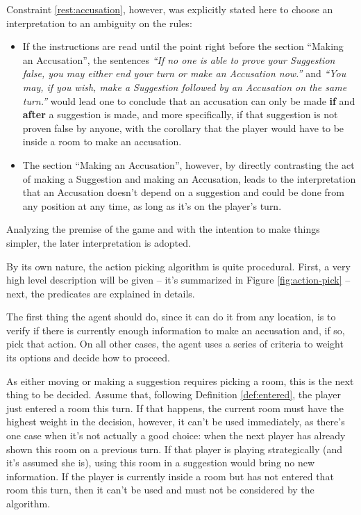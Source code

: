 \documentclass[12pt,a4paper]{article}
\begin{document}
Constraint \ref{rest:accusation}, however, was explicitly stated here to choose an interpretation to an ambiguity on the rules:
\begin{itemize}
    \item If the instructions are read until the point right before the section ``Making an Accusation'', the sentences \textit{``If no one is able to prove your Suggestion false, you may either end your turn or make an Accusation now.''} and \textit{``You may, if you wish, make a Suggestion followed by an Accusation on the same turn.''} would lead one to conclude that an accusation can only be made \textbf{if} and \textbf{after} a suggestion is made, and more specifically, if that suggestion is not proven false by anyone, with the corollary that the player would have to be inside a room to make an accusation.
    
    \item The section ``Making an Accusation'', however, by directly contrasting the act of making a Suggestion and making an Accusation, leads to the interpretation that an Accusation doesn't depend on a suggestion and could be done from any position at any time, as long as it's on the player's turn.
\end{itemize}

Analyzing the premise of the game and with the intention to make things simpler, the later interpretation is adopted.

By its own nature, the action picking algorithm is quite procedural. First, a very high level description will be given -- it's summarized in Figure \ref{fig:action-pick} -- next, the predicates are explained in details.

The first thing the agent should do, since it can do it from any location, is to verify if there is currently enough information to make an accusation and, if so, pick that action. On all other cases, the agent uses a series of criteria to weight its options and decide how to proceed.

As either moving or making a suggestion requires picking a room, this is the next thing to be decided. Assume that, following Definition \ref{def:entered}, the player just entered a room this turn. If that happens, the current room must have the highest weight in the decision, however, it can't be used immediately, as there's one case when it's not actually a good choice: when the next player has already shown this room on a previous turn. If that player is playing strategically (and it's assumed she is), using this room in a suggestion would bring no new information. If the player is currently inside a room but has not entered that room this turn, then it can't be used and must not be considered by the algorithm.
\end{document}
